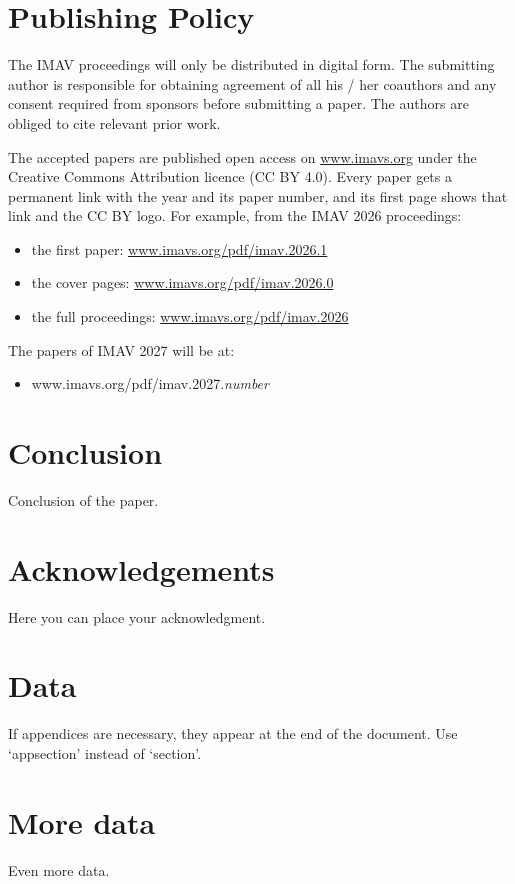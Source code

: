 \documentclass{article}
\begin{document}
\section{Publishing Policy}
The IMAV proceedings will only be distributed in digital form. The submitting author is responsible for obtaining agreement of all his / her coauthors and any consent required from sponsors before submitting a paper. The authors are obliged to cite relevant prior work.

The accepted papers are published open access on \href{https://www.imavs.org/}{www.imavs.org} under the Creative Commons Attribution licence (CC BY 4.0). Every paper gets a permanent link with the year and its paper number, and its first page shows that link and the CC BY logo. For example, from the IMAV 2026 proceedings:
\begin{itemize}
\item the first paper: \href{https://www.imavs.org/pdf/imav.2026.1}{www.imavs.org/pdf/imav.2026.1}
\item the cover pages: \href{https://www.imavs.org/pdf/imav.2026.0}{www.imavs.org/pdf/imav.2026.0}
\item the full proceedings: \href{https://www.imavs.org/pdf/imav.2026}{www.imavs.org/pdf/imav.2026}
\end{itemize}
The papers of IMAV 2027 will be at:
\begin{itemize}
\item www.imavs.org/pdf/imav.2027.\textit{number}
\end{itemize}

\section{Conclusion}
Conclusion of the paper.

\section*{Acknowledgements}
Here you can place your acknowledgment.




\appendix
\newcommand{\appsection}[1]{\let\oldthesection\thesection
  \renewcommand{\thesection}{Appendix \oldthesection:}
  \section{#1}\let\thesection\oldthesection}

\appsection{Data}
If appendices are necessary, they appear at the end of the document. Use `appsection' instead of `section'.
\appsection{More data}
Even more data.
\end{document}
